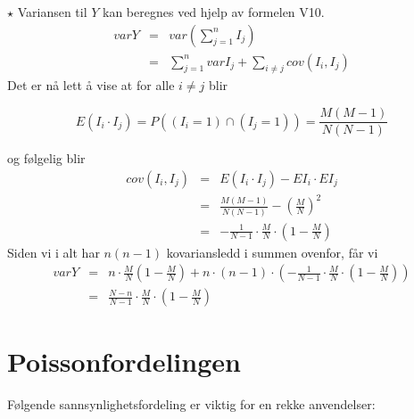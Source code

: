 \small
\noindent $\star$ Variansen til $Y$ kan beregnes ved hjelp av formelen V10.
\begin{eqnarray*}
 varY&=&var(\sum_{j=1}^n I_j) \\
     &=&\sum_{j=1}^n varI_j+\sum_{i \ne j} cov(I_i, I_j)
\end{eqnarray*}
\noindent Det er nå lett å vise at for alle $i\not= j$ blir

\[ E(I_i \cdot I_j)=P((I_i=1) \cap (I_j=1))=\frac{M(M-1)}{N(N-1)} \]

\noindent og følgelig blir
\begin{eqnarray*}
     cov(I_i, I_j)&=&E(I_i\cdot I_j)-EI_i\cdot EI_j \\
                  &=&\frac{M(M-1)}{N(N-1)}-{(\frac{M}{N})}^2 \\
                  &=&-\frac{1}{N-1} \cdot \frac{M}{N} \cdot (1-\frac{M}{N})
\end{eqnarray*}
\noindent Siden vi i alt har $n(n-1)$ kovariansledd i summen ovenfor, får vi
\begin{eqnarray*}
  varY&=&n \cdot \frac{M}{N} (1-\frac{M}{N})+  n \cdot (n-1)
         \cdot ( -\frac{1}{N-1} \cdot \frac{M}{N} \cdot (1-\frac{M}{N}))\\
      &=&\frac{N-n}{N-1} \cdot \frac{M}{N} \cdot (1-\frac{M}{N})
\end{eqnarray*}
\normalsize

\section{Poissonfordelingen}

Følgende sannsynlighetsfordeling er viktig for en rekke
anvendelser:

\begin{center}  \end{center}

